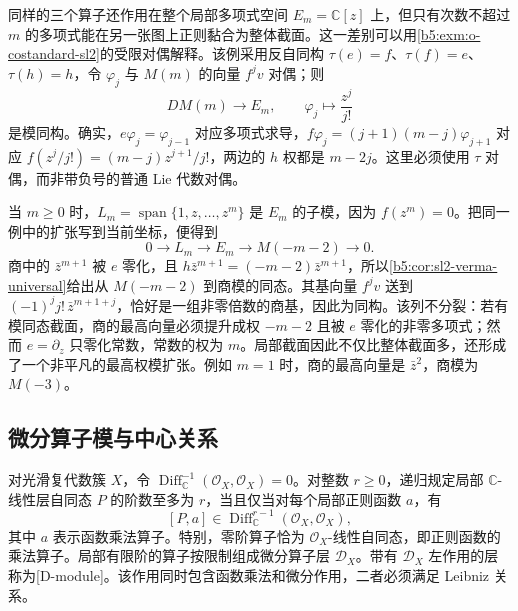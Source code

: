 \ProseParagraphBreak
同样的三个算子还作用在整个局部多项式空间 \(E_m=\mathbb C[z]\) 上，但只有次数不超过 \(m\) 的多项式能在另一张图上正则黏合为整体截面。这一差别可以用\cref{b5:exm:o-costandard-sl2}的受限对偶解释。该例采用反自同构 \(\tau(e)=f\)、\(\tau(f)=e\)、\(\tau(h)=h\)，令 \(\varphi_j\) 与 \(M(m)\) 的向量 \(f^jv\) 对偶；则
\[
	D M(m)\longrightarrow E_m,\qquad \varphi_j\longmapsto\frac{z^j}{j!}
\]
是模同构。确实，\(e\varphi_j=\varphi_{j-1}\) 对应多项式求导，\(f\varphi_j=(j+1)(m-j)\varphi_{j+1}\) 对应 \(f(z^j/j!)=(m-j)z^{j+1}/j!\)，两边的 \(h\) 权都是 \(m-2j\)。这里必须使用 \(\tau\) 对偶，而非带负号的普通 Lie 代数对偶。

\ProseParagraphBreak
当 \(m\ge0\) 时，\(L_m=\operatorname{span}\{1,z,\ldots,z^m\}\) 是 \(E_m\) 的子模，因为 \(f(z^m)=0\)。把同一例中的扩张写到当前坐标，便得到
\[
	0\longrightarrow L_m\longrightarrow E_m \longrightarrow M(-m-2)\longrightarrow0.
\]
商中的 \(\bar z^{m+1}\) 被 \(e\) 零化，且 \(h\bar z^{m+1}=(-m-2)\bar z^{m+1}\)，所以\cref{b5:cor:sl2-verma-universal}给出从 \(M(-m-2)\) 到商模的同态。其基向量 \(f^jv\) 送到 \((-1)^j j!\,\bar z^{m+1+j}\)，恰好是一组非零倍数的商基，因此为同构。该列不分裂：若有模同态截面，商的最高向量必须提升成权 \(-m-2\) 且被 \(e\) 零化的非零多项式；然而 \(e=\partial_z\) 只零化常数，常数的权为 \(m\)。局部截面因此不仅比整体截面多，还形成了一个非平凡的最高权模扩张。例如 \(m=1\) 时，商的最高向量是 \(\bar z^2\)，商模为 \(M(-3)\)。

\subsection{微分算子模与中心关系}
\label{b5:subsec:C04:03}

对光滑复代数簇 \(X\)，令 \(\operatorname{Diff}^{-1}_{\mathbb C}(\mathcal O_X,\mathcal O_X)=0\)。对整数 \(r\ge0\)，递归规定局部 \(\mathbb C\)-线性层自同态 \(P\) 的阶数至多为 \(r\)，当且仅当对每个局部正则函数 \(a\)，有
\[
	[P,a]\in\operatorname{Diff}^{r-1}_{\mathbb C}(\mathcal O_X,\mathcal O_X),
\]
其中 \(a\) 表示函数乘法算子。特别，零阶算子恰为 \(\mathcal O_X\)-线性自同态，即正则函数的乘法算子。局部有限阶的算子按限制组成微分算子层 \(\mathcal D_X\)。带有 \(\mathcal D_X\) 左作用的层称为[D-module]。该作用同时包含函数乘法和微分作用，二者必须满足 Leibniz 关系。

